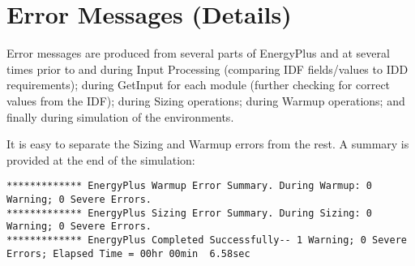 \chapter{Error Messages (Details)}\label{error-messages-details}

Error messages are produced from several parts of EnergyPlus and at several times prior to and during Input Processing (comparing IDF fields/values to IDD requirements); during GetInput for each module (further checking for correct values from the IDF); during Sizing operations; during Warmup operations; and finally during simulation of the environments.

It is easy to separate the Sizing and Warmup errors from the rest. A summary is provided at the end of the simulation:

\begin{lstlisting}
************* EnergyPlus Warmup Error Summary. During Warmup: 0 Warning; 0 Severe Errors.
************* EnergyPlus Sizing Error Summary. During Sizing: 0 Warning; 0 Severe Errors.
************* EnergyPlus Completed Successfully-- 1 Warning; 0 Severe Errors; Elapsed Time = 00hr 00min  6.58sec
\end{lstlisting}
